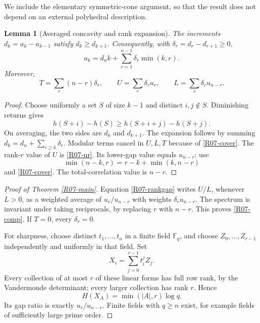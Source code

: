 \documentclass[11pt,a4paper]{article}
\newtheorem{lemma}[theorem]{Lemma}
\theoremstyle{definition}\newtheorem{definition}[theorem]{Definition}
\theoremstyle{remark}\newtheorem{remark}[theorem]{Remark}
\numberwithin{equation}{section}
\begin{document}
We include the elementary symmetric-cone argument, so that the result does not depend on an external polyhedral description.

\begin{lemma}[Averaged concavity and rank expansion]\label{R07-conc}
The increments $d_k=a_k-a_{k-1}$ satisfy $d_k\ge d_{k+1}$. Consequently, with $\delta_r=d_r-d_{r+1}\ge0$,
\begin{equation}\label{R07-rankexp}
 a_k=d_n k+\sum_{r=1}^{n-1}\delta_r\min(k,r).
\end{equation}
Moreover,
\begin{equation}\label{R07-rankgap}
 T=\sum_r(n-r)\delta_r,\qquad
 U=\sum_r\delta_r u_r,\qquad L=\sum_r\delta_r u_{n-r}.
\end{equation}
\end{lemma}
\begin{proof}
Choose uniformly a set $S$ of size $k-1$ and distinct $i,j\notin S$. Diminishing returns gives
\[
h(S+i)-h(S)\ge h(S+i+j)-h(S+j).
\]
On averaging, the two sides are $d_k$ and $d_{k+1}$. The expansion follows by summing $d_k=d_n+\sum_{r\ge k}\delta_r$. Modular terms cancel in $U,L,T$ because of \eqref{R07-cover}. The rank-$r$ value of $U$ is \eqref{R07-ur}. Its lower-gap value equals $u_{n-r}$: use
\[
\min(n-k,r)=r-k+\min(k,n-r)
\]
and \eqref{R07-cover}. The total-correlation value is $n-r$.
\end{proof}

\begin{proof}[Proof of Theorem \ref{R07-main}]
Equation \eqref{R07-rankgap} writes $U/L$, whenever $L>0$, as a weighted average of $u_r/u_{n-r}$ with weights $\delta_r u_{n-r}$. The spectrum is invariant under taking reciprocals, by replacing $r$ with $n-r$. This proves \eqref{R07-comp}. If $T=0$, every $\delta_r=0$.

For sharpness, choose distinct $t_1,\ldots,t_n$ in a finite field $\mathbb F_q$, and choose $Z_0,\ldots,Z_{r-1}$ independently and uniformly in that field. Set
\begin{equation}\label{R07-MDS}
 X_i=\sum_{j=0}^{r-1}t_i^jZ_j.
\end{equation}
Every collection of at most $r$ of these linear forms has full row rank, by the Vandermonde determinant; every larger collection has rank $r$. Hence
\[
 H(X_A)=\min(|A|,r)\log q.
\]
Its gap ratio is exactly $u_r/u_{n-r}$. Finite fields with $q\ge n$ exist, for example fields of sufficiently large prime order.
\end{proof}
\end{document}
